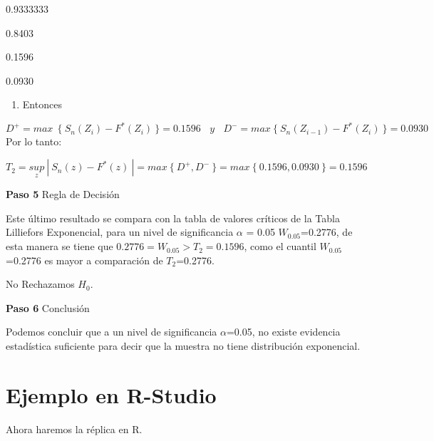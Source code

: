 \documentclass[
  a4paper,
  oneside,
  openany]{book}
\providecommand{\tightlist}{%
  \setlength{\itemsep}{0pt}\setlength{\parskip}{0pt}}
\begin{document}
0.9333333

0.8403

0.1596

0.0930

\begin{enumerate}
\def\labelenumi{\arabic{enumi})}
\setcounter{enumi}{8}
\tightlist
\item
  Entonces
\end{enumerate}

\[ D^+= max \ \  \{\ S_{n}(Z_{i})-F^*(Z_{i}) \ \}= 0.1596 \ \ \ \ y\ \ \ \ D^-= max\  \{ \ S_{n}(Z_{i-1})-F^*(Z_{i}) \ \}=0.0930 \]
Por lo tanto:

\[T_{2}=\underset{z}{sup}\ | \ S_{n}(z)-F^*(z) \ |=max \ \{\ D^+,D^- \ \}=max \ \{ \ 0.1596,0.0930 \ \}=0.1596 \]

\textbf{Paso 5} Regla de Decisión

Este último resultado se compara con la tabla de valores críticos de la Tabla Lilliefors Exponencial, para un nivel de significancia \(\alpha\) = 0.05 \(W_{0.05}\)=0.2776, de esta manera se tiene que \(0.2776 = W_{0.05} > T_{2} = 0.1596\), como el cuantil \(W_{0.05}\)=0.2776 es mayor a comparación de \(T_{2}\)=0.2776.

No Rechazamos \(H_0\).

\textbf{Paso 6} Conclusión

Podemos concluir que a un nivel de significancia \(\alpha\)=0.05, no existe evidencia estadística suficiente para decir que la muestra no tiene distribución exponencial.

\hypertarget{ejemplo-en-r-studio-16}{%
\section{Ejemplo en R-Studio}\label{ejemplo-en-r-studio-16}}

Ahora haremos la réplica en R.
\end{document}

